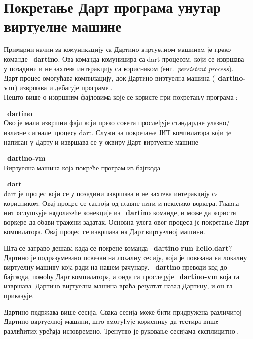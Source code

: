 \documentclass[12pt,oneside]{memoir}
\begin{document}
\section{Покретање Дарт програма унутар виртуелне машине}
\label{sec:pokretanje}

Примарни начин за комуникацију са Дартино виртуелном машином је преко команде ~\textbf{dartino}. Ова команда комуницира са dart процесом, који се извршава у позадини и не захтева интеракцију са корисником (енг.~\textit{persistent process}). Дарт процес омогућава компилацију, док Дартино виртуелна машина (~\textbf{dartino-vm}) извршава и дебагује програме .\\

Нешто више о извршним фајловима које се користе при покретању програма \cite{komande}:
\begin{description}
\item ~\textbf{dartino}\\
Ово је мали извршни фајл који преко сокета прослеђује стандардне улазно/излазне сигнале процесу dart. Служи за покретање ЈИТ компилатора који je написан у Дарту и извршава се у оквиру Дарт виртуелне машине
\item ~\textbf{dartino-vm} \\
Виртуелна машина која покреће програм из бајткода.
\item ~\textbf{dart} \\
dart је процес који се у позадини извршава и не захтева интеракцију са корисником. Овај процес се састоји од главне нити и неколико воркера. Главна нит ослушкује надолазеће конекције из ~\textbf{dartino} команде, и може да користи воркере да обави тражени задатак. Основна улога овог процеса је покретање Дарт компилатора. Овај процес се извршава на Дарт виртуелној машини.
\end{description}

Шта се заправо дешава када се покрене команда ~\textbf{dartino run hello.dart}? Дартино је подразумевано повезан на локалну сесију, која је повезана на локалну виртуелну машину која ради на нашем рачунару. ~\textbf{dartino} преводи код до бајткода, помоћу Дарт компилатора, а онда га прослеђује ~\textbf{dartino-vm} која га извршава. Дартино виртуелна машина враћа резултат назад Дартину, и он га приказује.

Дартино подржава више сесија. Свака сесија може бити придружена различитој Дартино виртуелној машини, што омогућује кориснику да тестира више разлићитих уређаја истовремено. Тренутно је руковање сесијама експлицитно \cite{Dartino} \cite{komande}.
\end{document}
